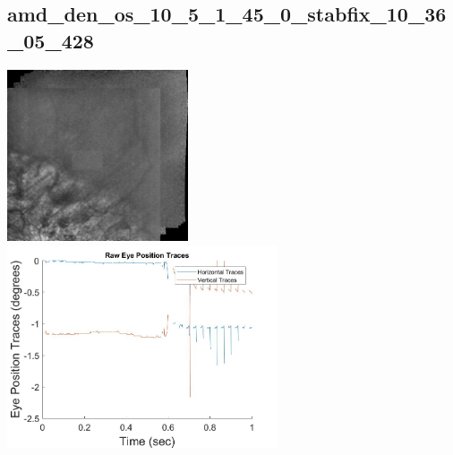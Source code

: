 \documentclass[11pt]{article}
\begin{document}
\subsection{amd\_den\_os\_10\_5\_1\_45\_0\_stabfix\_10\_36\_05\_428}
\includegraphics[width=0.40\textwidth, valign=m]{referenceframes/tslo_amd/amd_den_os_10_5_1_45_0_stabfix_10_36_05_428_dwt_nostim_gamscaled_bandfilt_refframe.jpg}
\includegraphics[width=0.60\textwidth, valign=m]{eyepositiontraces/tslo_amd/amd_den_os_10_5_1_45_0_stabfix_10_36_05_428.jpg}\\
\end{document}

